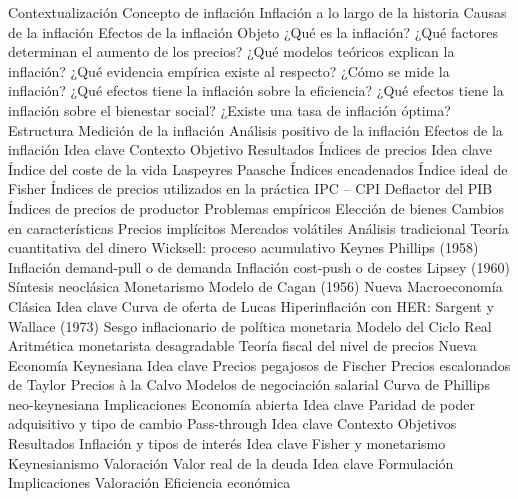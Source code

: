 \documentclass{nuevotema}
\begin{document}
\begin{esquema}[enumerate]
	\1[] 
		\2 Contextualización
			\3 Concepto de inflación
			\3 Inflación a lo largo de la historia
			\3 Causas de la inflación
			\3 Efectos de la inflación
		\2 Objeto
			\3 ¿Qué es la inflación?
			\3 ¿Qué factores determinan el aumento de los precios?
			\3 ¿Qué modelos teóricos explican la inflación?
			\3 ¿Qué evidencia empírica existe al respecto?
			\3 ¿Cómo se mide la inflación?
			\3 ¿Qué efectos tiene la inflación sobre la eficiencia?
			\3 ¿Qué efectos tiene la inflación sobre el bienestar social?
			\3 ¿Existe una tasa de inflación óptima?
		\2 Estructura
			\3 Medición de la inflación
			\3 Análisis positivo de la inflación
			\3 Efectos de la inflación
	\1 
		\2 Idea clave
			\3 Contexto
			\3 Objetivo
			\3 Resultados
		\2 Índices de precios
			\3 Idea clave
			\3 Índice del coste de la vida
			\3 Laspeyres
			\3 Paasche
			\3 Índices encadenados
			\3 Índice ideal de Fisher
		\2 Índices de precios utilizados en la práctica
			\3 IPC -- CPI
			\3 Deflactor del PIB
			\3 Índices de precios de productor
		\2 Problemas empíricos
			\3 Elección de bienes
			\3 Cambios en características
			\3 Precios implícitos
			\3 Mercados volátiles
	\1 
		\2 Análisis tradicional
			\3 Teoría cuantitativa del dinero
			\3 Wicksell: proceso acumulativo
			\3 Keynes
			\3 Phillips (1958)
			\3 Inflación demand-pull o de demanda
			\3 Inflación cost-push o de costes
			\3 Lipsey (1960)
			\3 Síntesis neoclásica
			\3 Monetarismo
			\3 Modelo de Cagan (1956)
		\2 Nueva Macroeconomía Clásica
			\3 Idea clave
			\3 Curva de oferta de Lucas
			\3 Hiperinflación con HER: Sargent y Wallace (1973)
			\3 Sesgo inflacionario de política monetaria
			\3 Modelo del Ciclo Real
			\3 Aritmética monetarista desagradable
			\3 Teoría fiscal del nivel de precios
		\2 Nueva Economía Keynesiana
			\3 Idea clave
			\3 Precios pegajosos de Fischer
			\3 Precios escalonados de Taylor
			\3 Precios à la Calvo
			\3 Modelos de negociación salarial
			\3 Curva de Phillips neo-keynesiana
			\3 Implicaciones
		\2 Economía abierta
			\3 Idea clave
			\3 Paridad de poder adquisitivo y tipo de cambio
			\3 Pass-through
	\1 
		\2 Idea clave
			\3 Contexto
			\3 Objetivos
			\3 Resultados
		\2 Inflación y tipos de interés
			\3 Idea clave
			\3 Fisher y monetarismo
			\3 Keynesianismo
			\3 Valoración
		\2 Valor real de la deuda
			\3 Idea clave
			\3 Formulación
			\3 Implicaciones
			\3 Valoración
		\2 Eficiencia económica

\end{esquema}
\end{document}
